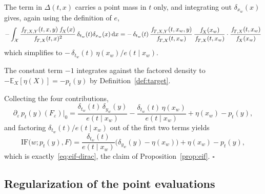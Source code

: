 \documentclass[11pt]{article}
\theoremstyle{plain}
\theoremstyle{definition}
\theoremstyle{remark}
\newcommand{\pE}{\ensuremath{\mathbb{E}}}
\newcommand{\cX}{\ensuremath{\mathcal{X}}}
\newcommand{\pf}[1]{\ensuremath{\,\mathlarger{\textit{f}}_{#1}}}
\newcommand{\dd}{\,\mathrm{d}}
\newcommand{\IF}{\mathrm{IF}}
\newcommand{\gps}{e}
\begin{document}
The term in $\Delta(t,x)$ carries a point mass in $t$ only, and integrating out $\delta_{x_w}(x)$
gives, again using the definition of $\gps$,
\[
-\int_{\cX} \frac{\pf{T,X,Y}(t,x,y)\,\pf{X}(x)}{\pf{T,X}(t,x)^2}\,
\delta_{t_w}(t)\delta_{x_w}(x)\dd x
= -\,\delta_{t_w}(t)\,\frac{\pf{T,X,Y}(t,x_w,y)}{\pf{T,X}(t,x_w)}\,\frac{\pf{X}(x_w)}{\pf{T,X}(t,x_w)}\cdot\frac{\pf{T,X}(t,x_w)}{\pf{X}(x_w)}
\]
which simplifies to
$-\,\delta_{t_w}(t)\,\eta(x_w)/\gps(t \mid x_w)$.

The constant term $-1$ integrates against the factored density to $-\pE_X[\eta(X)] = -p_t(y)$
by Definition~\ref{def:target}.

Collecting the four contributions,
\[
\partial_\varepsilon\, p_t(y)(F_\varepsilon)\big|_{0}
= \frac{\delta_{t_w}(t)\,\delta_{y_w}(y)}{\gps(t \mid x_w)}
- \frac{\delta_{t_w}(t)\,\eta(x_w)}{\gps(t \mid x_w)}
+ \eta(x_w) - p_t(y),
\]
and factoring $\delta_{t_w}(t)/\gps(t\mid x_w)$ out of the first two terms yields
\[
\IF\big(w;p_t(y),F\big)
= \frac{\delta_{t_w}(t)}{\gps(t \mid x_w)}\Big(\delta_{y_w}(y) - \eta(x_w)\Big)
+ \eta(x_w) - p_t(y),
\]
which is exactly~\eqref{eq:eif-dirac}, the claim of Proposition~\ref{prop:eif}. \hfill$\square$

\subsection{Regularization of the point evaluations}
\label{app:classical-kernels}
\end{document}
